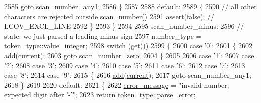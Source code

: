 \begin{DoxyCode}
2585                 \textcolor{keywordflow}{goto} scan\_number\_any1;
2586             \}
2587 
2588             \textcolor{keywordflow}{default}:
2589             \{
2590                 \textcolor{comment}{// all other characters are rejected outside scan\_number()}
2591                 assert(\textcolor{keyword}{false}); \textcolor{comment}{// LCOV\_EXCL\_LINE}
2592             \}
2593         \}
2594 
2595 scan\_number\_minus:
2596         \textcolor{comment}{// state: we just parsed a leading minus sign}
2597         number\_type = \hyperlink{classnlohmann_1_1detail_1_1lexer_a3f313cdbe187cababfc5e06f0b69b098a5064b6655d88a50ae16665cf7751c0ee}{token\_type::value\_integer};
2598         \textcolor{keywordflow}{switch} (\textcolor{keyword}{get}())
2599         \{
2600             \textcolor{keywordflow}{case} \textcolor{charliteral}{'0'}:
2601             \{
2602                 \hyperlink{classnlohmann_1_1detail_1_1lexer_acec899d31af1fd647911e46e8535c283}{add}(\hyperlink{classnlohmann_1_1detail_1_1lexer_a47169f9aaf0da4c9885e61d3109859aa}{current});
2603                 \textcolor{keywordflow}{goto} scan\_number\_zero;
2604             \}
2605 
2606             \textcolor{keywordflow}{case} \textcolor{charliteral}{'1'}:
2607             \textcolor{keywordflow}{case} \textcolor{charliteral}{'2'}:
2608             \textcolor{keywordflow}{case} \textcolor{charliteral}{'3'}:
2609             \textcolor{keywordflow}{case} \textcolor{charliteral}{'4'}:
2610             \textcolor{keywordflow}{case} \textcolor{charliteral}{'5'}:
2611             \textcolor{keywordflow}{case} \textcolor{charliteral}{'6'}:
2612             \textcolor{keywordflow}{case} \textcolor{charliteral}{'7'}:
2613             \textcolor{keywordflow}{case} \textcolor{charliteral}{'8'}:
2614             \textcolor{keywordflow}{case} \textcolor{charliteral}{'9'}:
2615             \{
2616                 \hyperlink{classnlohmann_1_1detail_1_1lexer_acec899d31af1fd647911e46e8535c283}{add}(\hyperlink{classnlohmann_1_1detail_1_1lexer_a47169f9aaf0da4c9885e61d3109859aa}{current});
2617                 \textcolor{keywordflow}{goto} scan\_number\_any1;
2618             \}
2619 
2620             \textcolor{keywordflow}{default}:
2621             \{
2622                 \hyperlink{classnlohmann_1_1detail_1_1lexer_ae2a15e440f1889e0ab0c6a35344e48df}{error\_message} = \textcolor{stringliteral}{"invalid number; expected digit after '-'"};
2623                 \textcolor{keywordflow}{return} \hyperlink{classnlohmann_1_1detail_1_1lexer_a3f313cdbe187cababfc5e06f0b69b098a456e19aeafa334241c7ff3f589547f9d}{token\_type::parse\_error};

\end{DoxyCode}
